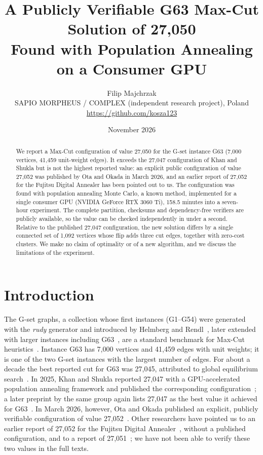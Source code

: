 \documentclass[11pt]{article}
\title{A Publicly Verifiable G63 Max-Cut Solution of 27,050\\Found with Population Annealing on a Consumer GPU}
\author{Filip Majchrzak\\
\small SAPIO MORPHEUS / COMPLEX (independent research project), Poland\\
\small \url{https://github.com/kosza123}}
\date{November 2026}
\begin{document}
\maketitle

\begin{abstract}
We report a Max-Cut configuration of value 27,050 for the G-set instance G63 (7,000 vertices, 41,459 unit-weight edges).
It exceeds the 27,047 configuration of Khan and Shukla but is not the highest reported value: an explicit public configuration of
value 27,052 was published by Ota and Okada in March 2026, and an earlier report of 27,052 for the Fujitsu Digital Annealer has been
pointed out to us.
The configuration was found with population annealing Monte Carlo,
a known method, implemented for a single consumer GPU (NVIDIA GeForce RTX 3060 Ti), 158.5 minutes into a seven-hour experiment.
The complete partition, checksums and dependency-free verifiers are publicly available, so the value can be checked
independently in under a second. Relative to the published 27,047 configuration, the new solution differs by a single connected
set of 1,092 vertices whose flip adds three cut edges, together with zero-cost clusters. We make no claim of optimality or
of a new algorithm, and we discuss the limitations of the experiment.
\end{abstract}

\section{Introduction}
The G-set graphs, a collection whose first instances (G1--G54) were generated with the \emph{rudy} generator and introduced by
Helmberg and Rendl~\cite{helmberg2000}, later extended with larger instances including G63~\cite{gset}, are a standard benchmark for
Max-Cut heuristics~\cite{benlic2013,shylo2015}. Instance G63 has 7,000 vertices and 41,459 edges with
unit weights; it is one of the two G-set instances with the largest number of edges. For about a decade the best reported cut for G63
was 27,045, attributed to global equilibrium search~\cite{shylo2015}. In 2025, Khan and Shukla reported 27,047 with a GPU-accelerated
population annealing framework and published the corresponding configuration~\cite{khan2025}; a later preprint by the same group again
lists 27,047 as the best value it achieved for G63~\cite{khan2026}. In March 2026, however, Ota and Okada published an explicit,
publicly verifiable configuration of value 27,052~\cite{otaokada2026}. Other researchers have pointed us to an earlier report of 27,052
for the Fujitsu Digital Annealer~\cite{matsubara2020,takemoto2021}, without a published configuration, and to a report of
27,051~\cite{ju2026}; we have not been able to verify these two values in the full texts.
\end{document}
